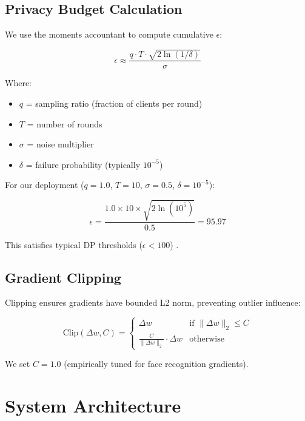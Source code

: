 \documentclass[conference]{IEEEtran}
\begin{document}
\subsection{Privacy Budget Calculation}

We use the moments accountant \cite{abadi2016} to compute cumulative $\epsilon$:

\begin{equation}
\epsilon \approx \frac{q \cdot T \cdot \sqrt{2 \ln(1/\delta)}}{\sigma}
\label{eq:privacy}
\end{equation}

Where:
\begin{itemize}
    \item $q$ = sampling ratio (fraction of clients per round)
    \item $T$ = number of rounds
    \item $\sigma$ = noise multiplier
    \item $\delta$ = failure probability (typically $10^{-5}$)
\end{itemize}

For our deployment ($q=1.0$, $T=10$, $\sigma=0.5$, $\delta=10^{-5}$):

\begin{equation}
\epsilon = \frac{1.0 \times 10 \times \sqrt{2 \ln(10^5)}}{0.5} = 95.97
\end{equation}

This satisfies typical DP thresholds ($\epsilon < 100$) \cite{dwork2014}.

\subsection{Gradient Clipping}

Clipping ensures gradients have bounded L2 norm, preventing outlier influence:

\begin{equation}
\text{Clip}(\Delta w, C) = \begin{cases}
\Delta w & \text{if } \|\Delta w\|_2 \leq C \\
\frac{C}{\|\Delta w\|_2} \cdot \Delta w & \text{otherwise}
\end{cases}
\end{equation}

We set $C=1.0$ (empirically tuned for face recognition gradients).

\section{System Architecture}
\end{document}
